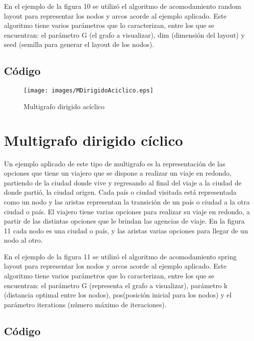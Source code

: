 \documentclass{article}
\begin{document}
En el ejemplo de la figura 10 se utilizó el algoritmo de acomodamiento random layout para representar los nodos y arcos acorde al ejemplo aplicado. Este algoritmo tiene varios parámetros que lo caracterizan, entre los que se encuentran: el parámetro G (el grafo a visualizar), dim (dimensión del layout) y seed (semilla para generar el layout de los nodos).

\subsection{Código}


\begin{figure}[H]
\centering
\texttt{[image: images/MDirigidoAciclico.eps]}
\caption{Multigrafo dirigido acíclico}
\end{figure}

\section{Multigrafo dirigido cíclico}

Un ejemplo aplicado de este tipo de multigrafo es la representación de las opciones que tiene un viajero que se dispone a realizar un viaje en redondo, partiendo de la ciudad donde vive y regresando al final del viaje a la ciudad de donde partió, la ciudad origen. Cada país o ciudad visitada está representada como un nodo y las aristas representan la transición de un país o ciudad a la otra ciudad o país. El viajero tiene varias opciones para realizar su viaje en redondo, a partir de las distintas opciones que le brindan las agencias de viaje. En la figura 11 cada nodo es una ciudad o país, y las aristas varias opciones para llegar de un nodo al otro.

En el ejemplo de la figura 11 se utilizó el algoritmo de acomodamiento spring layout para representar los nodos y arcos acorde al ejemplo aplicado. Este algoritmo tiene varios parámetros que lo caracterizan, entre los que se encuentran: el parámetro G (representa el grafo a visualizar), parámetro k (distancia optimal entre los nodos), pos(posición inicial para los nodos) y el parámetro iterations (número máximo de iteraciones).

\subsection{Código}

\end{document}
